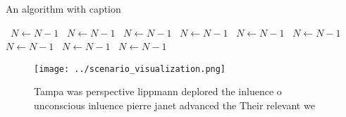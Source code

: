 \documentclass[a4paper]{article}
\begin{document}
\begin{algorithm}
\caption{An algorithm with caption}
\begin{algorithmic}
\    \State $N \gets N - 1$
\    \State $N \gets N - 1$
\    \State $N \gets N - 1$
\    \State $N \gets N - 1$
\    \State $N \gets N - 1$
\    \State $N \gets N - 1$
\    \State $N \gets N - 1$
\    \State $N \gets N - 1$
\    \State $N \gets N - 1$
\EndWhile
\end{algorithmic}
\end{algorithm}

\begin{figure}
\centering
\texttt{[image: ../scenario\_visualization.png]}
\caption{Tampa was perspective lippmann deplored the inluence o unconscious inluence pierre janet advanced the Their relevant we
}
\end{figure}
 
\end{document}
